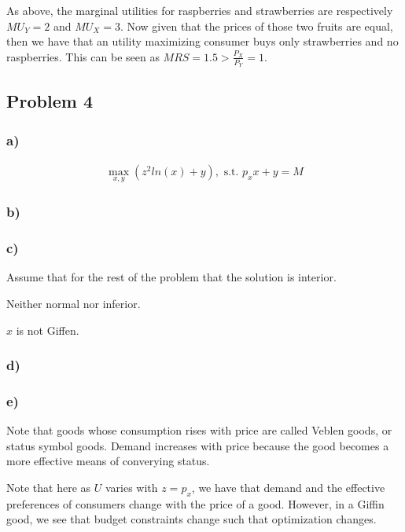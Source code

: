 \documentclass[12pt,letterpaper]{article}
\theoremstyle{definition}
\begin{document}
As above, the marginal utilities for raspberries and strawberries are respectively $MU_Y=2$ and $MU_X = 3$. Now given that the prices of those two fruits are equal, then we have that an utility maximizing consumer buys only strawberries and no raspberries. This can be seen as $MRS = 1.5 > \frac{P_X}{P_Y} = 1$.















\subsection*{Problem 4}
\subsubsection*{a)}
\begin{align*}
		\max_{x,y}(z^2ln(x) + y), \text{ s.t. } p_xx + y = M
\end{align*}

\subsubsection*{b)}

\subsubsection*{c)}
Assume that for the rest of the problem that the solution is interior.

Neither normal nor inferior.

$x$ is not Giffen.

\subsubsection*{d)}
\subsubsection*{e)}

Note that goods whose consumption rises with price are called Veblen goods, or status symbol goods.
Demand increases with price because the good becomes a more effective means of converying status.

Note that here as $U$ varies with $z = p_x$, we have that demand and the effective preferences of consumers change with the price of a good.
However, in a Giffin good, we see that budget constraints change such that optimization changes.
\end{document}
